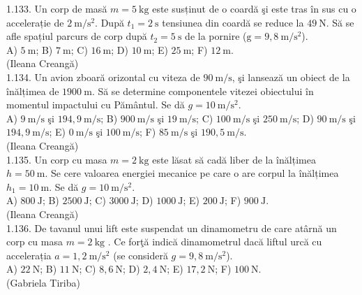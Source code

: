 1.133. Un corp de masă $m=5 \mathrm{~kg}$ este susținut de o coardă şi este tras în sus cu o accelerație de $2 \mathrm{~m} / \mathrm{s}^{2}$. După $t_{1}=2 \mathrm{~s}$ tensiunea din coardă se reduce la $49 \mathrm{~N}$. Să se afle spațiul parcurs de corp după $t_{2}=5 \mathrm{~s}$ de la pornire ($\mathrm{g}=9,8 \mathrm{~m} / \mathrm{s}^{2}$).\\ A) $5 \mathrm{~m}$; B) $7 \mathrm{~m}$; C) $16 \mathrm{~m}$; D) $10 \mathrm{~m}$; E) $25 \mathrm{~m}$; F) $12 \mathrm{~m}$.\\ (Ileana Creangă)\\

1.134. Un avion zboară orizontal cu viteza de $90 \mathrm{~m} / \mathrm{s}$, şi lansează un obiect de la înălțimea de $1900 \mathrm{~m}$. Să se determine componentele vitezei obiectului în momentul impactului cu Pământul. Se dă $g=10 \mathrm{~m} / \mathrm{s}^{2}$.\\ A) $9 \mathrm{~m} / \mathrm{s}$ şi $194,9 \mathrm{~m} / \mathrm{s}$; B) $900 \mathrm{~m} / \mathrm{s}$ şi $19 \mathrm{~m} / \mathrm{s}$; C) $100 \mathrm{~m} / \mathrm{s}$ şi $250 \mathrm{~m} / \mathrm{s}$; D) $90 \mathrm{~m} / \mathrm{s}$ şi $194,9 \mathrm{~m} / \mathrm{s}$; E) $0 \mathrm{~m} / \mathrm{s}$ şi $100 \mathrm{~m} / \mathrm{s}$; F) $85 \mathrm{~m} / \mathrm{s}$ şi $190,5 \mathrm{~m} / \mathrm{s}$.\\ (Ileana Creangă)\\

1.135. Un corp cu masa $m=2 \mathrm{~kg}$ este lăsat să cadă liber de la înălțimea $h=50 \mathrm{~m}$. Se cere valoarea energiei mecanice pe care o are corpul la înălțimea $h_{1}=10 \mathrm{~m}$. Se dă $g=10 \mathrm{~m} / \mathrm{s}^{2}$.\\ A) $800 \mathrm{~J}$; B) $2500 \mathrm{~J}$; C) $3000 \mathrm{~J}$; D) $1000 \mathrm{~J}$; E) $200 \mathrm{~J}$; F) $900 \mathrm{~J}$.\\ (Ileana Creangă)\\

1.136. De tavanul unui lift este suspendat un dinamometru de care atârnă un corp cu masa $m=2 \mathrm{~kg}$ . Ce forţă indică dinamometrul dacă liftul urcă cu accelerația $a=1,2 \mathrm{~m} / \mathrm{s}^{2}$ (se consideră $g=9,8 \mathrm{~m} / \mathrm{s}^{2}$).\\ A) $22 \mathrm{~N}$; B) $11 \mathrm{~N}$; C) $8,6 \mathrm{~N}$; D) $2,4 \mathrm{~N}$; E) $17,2 \mathrm{~N}$; F) $100 \mathrm{~N}$.\\ (Gabriela Tiriba)\\


